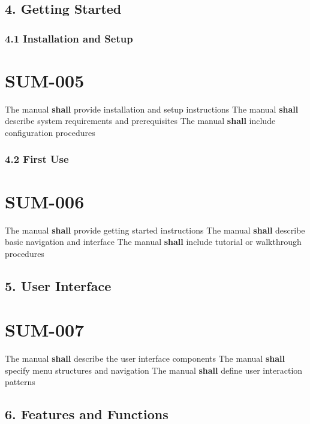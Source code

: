 \subsection{4. Getting Started}

\subsubsection{4.1 Installation and Setup}

\section{SUM-005}\label{SUM-005}

The manual \textbf{shall} provide installation and setup instructions
The manual \textbf{shall} describe system requirements and prerequisites
The manual \textbf{shall} include configuration procedures

\subsubsection{4.2 First Use}

\section{SUM-006}\label{SUM-006}

The manual \textbf{shall} provide getting started instructions
The manual \textbf{shall} describe basic navigation and interface
The manual \textbf{shall} include tutorial or walkthrough procedures

\subsection{5. User Interface}

\section{SUM-007}\label{SUM-007}

The manual \textbf{shall} describe the user interface components
The manual \textbf{shall} specify menu structures and navigation
The manual \textbf{shall} define user interaction patterns

\subsection{6. Features and Functions}

